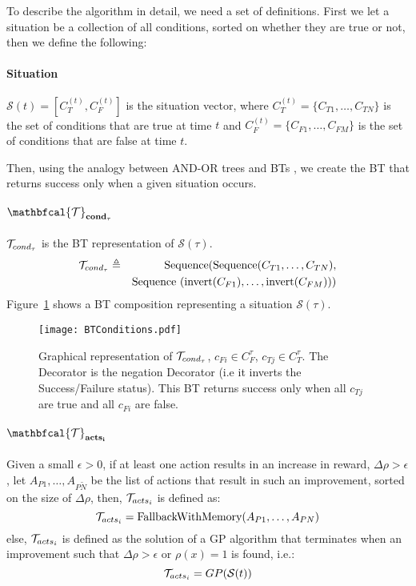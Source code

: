 To describe the algorithm in detail, we need a set of definitions.
First we let a situation be a collection of all conditions, sorted on whether they are true or not, then we define the following:

\paragraph*{\textbf{Situation}}
$\mathcal{S}(t) = [C_{T}^{(t)},C_{F}^{(t)}]$ is the situation vector, where $C_{T}^{(t)}=\{C_{T1},\ldots, C_{TN}\}$ is the set of conditions that are true at time $t$ and $C_{F}^{(t)}=\{C_{F1},\ldots, C_{FM}\}$ is the set of conditions that are false at time $t$.

Then, using the analogy between AND-OR trees and BTs \cite{colledanchise2016behavior}, we create the BT that returns success only when a given situation occurs.
\paragraph*{$\mathbfcal{\bt}_\mathbf{cond_\tau}$}
$\mathcal{T}_{cond_\tau}$ is the BT representation of $\mathcal{S}(\tau)$.
\begin{eqnarray}
 \bt_{cond_\tau}&\triangleq& \mbox{Sequence}(\mbox{Sequence}(C_{T1},\ldots, C_{TN}), \nonumber \\
 &&\mbox{Sequence
 }(\mbox{invert}(C_{F1}),\ldots,\mbox{invert} (C_{FM})) ) \hfill\label{eq:BTcond}
\end{eqnarray}
Figure~\ref{PA.fig.BTcond} shows a BT composition representing a situation $\mathcal{S}(\tau)$. 

\begin{figure}[h]
\centering
\texttt{[image: BTConditions.pdf]}
\caption{Graphical representation of $\mathcal{T}_{cond_\tau}$, $c_{Fi} \in C_F^\tau$, $c_{Tj} \in C_T^\tau$. The Decorator is the negation Decorator  (i.e it inverts the Success/Failure status). This BT returns success only when all $c_{Tj}$ are true and all $c_{Fi}$ are false. }
\label{PA.fig.BTcond}
\end{figure}


\paragraph*{$\mathbfcal{\bt}_\mathbf{acts_i}$}
Given a small $\epsilon > 0$,
if at least one action results in an increase in reward, $\Delta \rho > \epsilon$,
 let $A_{P1},\ldots, A_{P\tilde N}$ be the list of actions that result in such an improvement,
 sorted on the size of $\Delta \rho$,
then, $\mathcal{T}_{acts_i}$ is defined as:
\begin{equation}
 \mathcal{T}_{acts_i}= \mbox{FallbackWithMemory}(A_{P1},\ldots, A_{PN}) \label{eq:BTactSingle}
\end{equation}
 else, $ \mathcal{T}_{acts_i}$ is defined as the solution of a GP algorithm that terminates when an improvement such that $\Delta \rho > \epsilon$ or $\rho(x)=1$ is found, i.e.:
 \begin{equation}
 \mathcal{T}_{acts_i}= GP(\mathcal{S}(t)) \label{eq:BTactGP}
\end{equation}
